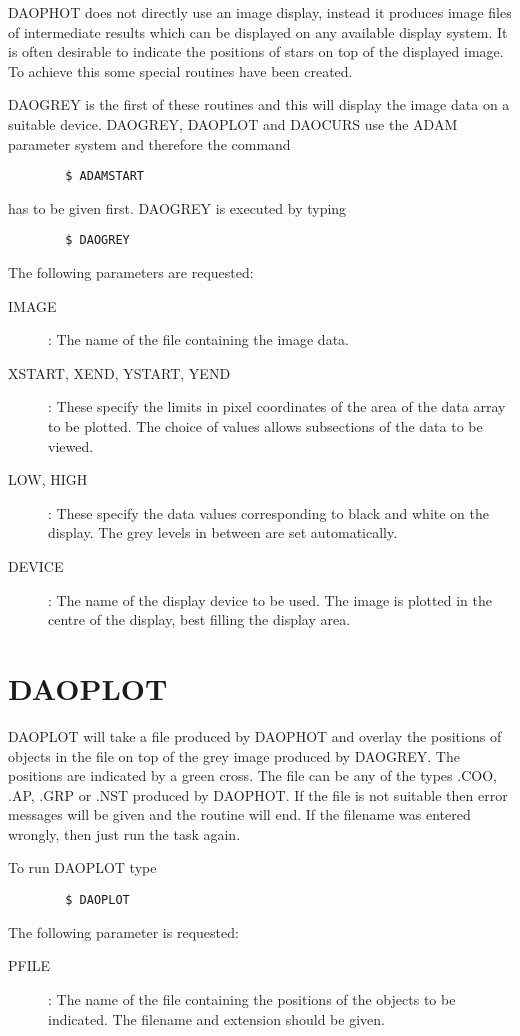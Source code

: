 DAOPHOT does not directly use an image display, instead it produces image files
of intermediate results which can be displayed on any available display system.
It is often desirable to indicate the positions of stars on top of the displayed
image. To achieve this some special routines have been created.

DAOGREY is the first of these routines and this will display the image data on
a suitable device.
DAOGREY, DAOPLOT and DAOCURS use the ADAM parameter system and therefore the
command
\begin{verbatim}
        $ ADAMSTART
\end{verbatim}
has to be given first.
DAOGREY is executed by typing
\begin{verbatim}
        $ DAOGREY
\end{verbatim}
The following parameters are requested:
\begin{description}
\begin{description}
\item[IMAGE] :
The name of the file containing the image data.
\item[XSTART, XEND, YSTART, YEND] :
These specify the limits in pixel coordinates of the area of the data array to
be plotted.
The choice of values allows subsections of the data to be viewed.
\item[LOW, HIGH] :
These specify the data values corresponding to black and white on the display.
The grey levels in between are set automatically.
\item[DEVICE] :
The name of the display device to be used.
The image is plotted in the centre of the display, best filling the display
area.
\end{description}
\end{description}

\section{DAOPLOT}

DAOPLOT will take a file produced by DAOPHOT and overlay the positions
of objects in the file on top of the grey image produced by DAOGREY.
The positions are indicated by a green cross.
The file can be any of the types .COO, .AP, .GRP or .NST produced by
DAOPHOT.
If the file is not suitable then error messages will be given and the routine
will end.
If the filename was entered wrongly, then just run the task again.

To run DAOPLOT type
\begin{verbatim}
        $ DAOPLOT
\end{verbatim}
The following parameter is requested:
\begin{description}
\begin{description}
\item[PFILE] :
The name of the file containing the positions of the objects to be indicated.
The filename and extension should be given.
\end{description}
\end{description}

